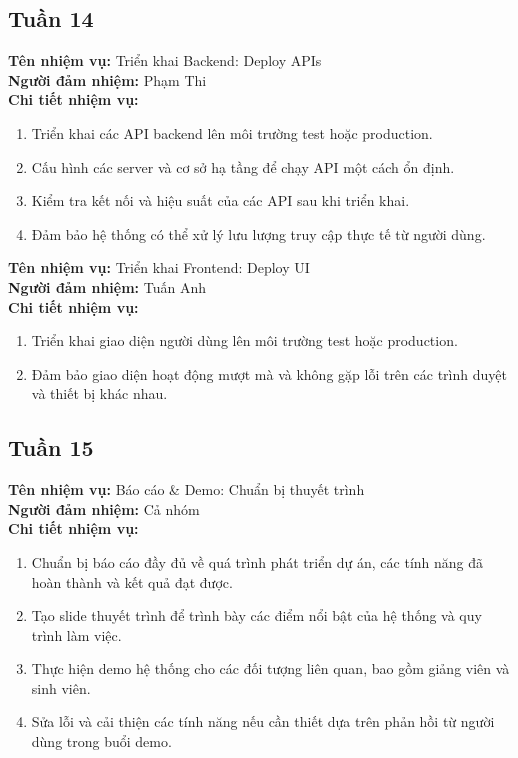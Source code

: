 \subsection*{Tuần 14}

\noindent \textbf{Tên nhiệm vụ:} Triển khai Backend: Deploy APIs \\
\noindent \textbf{Người đảm nhiệm:} Phạm Thi \\
\noindent \textbf{Chi tiết nhiệm vụ:} 
\begin{enumerate}[label=-]
    \item Triển khai các API backend lên môi trường test hoặc production. 
    \item Cấu hình các server và cơ sở hạ tầng để chạy API một cách ổn định. 
    \item Kiểm tra kết nối và hiệu suất của các API sau khi triển khai. 
    \item Đảm bảo hệ thống có thể xử lý lưu lượng truy cập thực tế từ người dùng.
\end{enumerate}

\noindent \textbf{Tên nhiệm vụ:} Triển khai Frontend: Deploy UI \\
\noindent \textbf{Người đảm nhiệm:} Tuấn Anh \\
\noindent \textbf{Chi tiết nhiệm vụ:} 
\begin{enumerate}[label=-]
    \item Triển khai giao diện người dùng lên môi trường test hoặc production. 
    \item Đảm bảo giao diện hoạt động mượt mà và không gặp lỗi trên các trình duyệt và thiết bị khác nhau.
\end{enumerate}

\subsection*{Tuần 15}

\noindent \textbf{Tên nhiệm vụ:} Báo cáo \& Demo: Chuẩn bị thuyết trình \\
\noindent \textbf{Người đảm nhiệm:} Cả nhóm \\
\noindent \textbf{Chi tiết nhiệm vụ:}
\begin{enumerate}[label=-]
    \item Chuẩn bị báo cáo đầy đủ về quá trình phát triển dự án, các tính năng đã hoàn thành và kết quả đạt được.
    \item Tạo slide thuyết trình để trình bày các điểm nổi bật của hệ thống và quy trình làm việc.
    \item Thực hiện demo hệ thống cho các đối tượng liên quan, bao gồm giảng viên và sinh viên.
    \item Sửa lỗi và cải thiện các tính năng nếu cần thiết dựa trên phản hồi từ người dùng trong buổi demo.
\end{enumerate}

